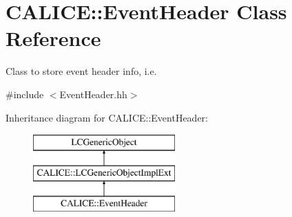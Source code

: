 \section{C\-A\-L\-I\-C\-E\-:\-:Event\-Header Class Reference}
\label{classCALICE_1_1EventHeader}


Class to store event header info, i.\-e.  




{\ttfamily \#include $<$Event\-Header.\-hh$>$}

Inheritance diagram for C\-A\-L\-I\-C\-E\-:\-:Event\-Header\-:\begin{figure}[H]
\begin{center}
\leavevmode
\includegraphics[height=3.000000cm]{classCALICE_1_1EventHeader}
\end{center}
\end{figure}

